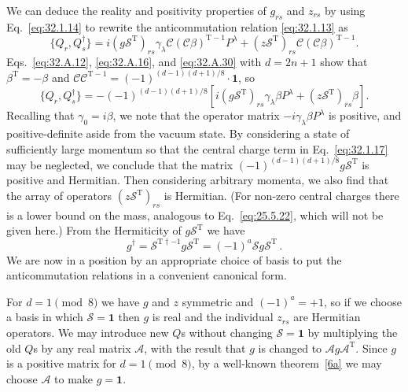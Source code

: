 We can deduce the reality and positivity properties of \(g_{rs}\) and
\(z_{rs}\) by using Eq.~\eqref{eq:32.1.14} to rewrite the anticommutation
relation \eqref{eq:32.1.13} as
\[
  \{Q_r,Q_s^\dagger\}
  =i(g\mathcal S^{\mathrm T})_{rs}
    \gamma_\lambda\mathcal C(\mathcal C\beta)^{\mathrm T-1}P^\lambda
  +(z\mathcal S^{\mathrm T})_{rs}
    \mathcal C(\mathcal C\beta)^{\mathrm T-1}.
\]
Eqs.~\eqref{eq:32.A.12}, \eqref{eq:32.A.16}, and
\eqref{eq:32.A.30} with \(d=2n+1\) show that
\(\beta^{\mathrm T}=-\beta\) and
\(\mathcal C\mathcal C^{\mathrm T-1}
=(-1)^{(d-1)(d+1)/8}\mathbin{\cdot}\mathbf{1}\), so
\begin{equation}
  \{Q_r,Q_s^\dagger\}
  =-(-1)^{(d-1)(d+1)/8}
  \left[
    i(g\mathcal S^{\mathrm T})_{rs}\gamma_\lambda\beta P^\lambda
    +(z\mathcal S^{\mathrm T})_{rs}\beta
  \right].
  \tag{32.1.17}\label{eq:32.1.17}
\end{equation}
Recalling that \(\gamma_0=i\beta\), we note that the operator matrix
\(-i\gamma_\lambda\beta P^\lambda\) is positive, and positive-definite
aside from the vacuum state. By considering a state of sufficiently large
momentum so that the central charge term in Eq.~\eqref{eq:32.1.17} may be
neglected, we conclude that the matrix
\((-1)^{(d-1)(d+1)/8}g\mathcal S^{\mathrm T}\) is positive and Hermitian.
Then considering arbitrary momenta, we also find that the array of operators
\((z\mathcal S^{\mathrm T})_{rs}\) is Hermitian. (For non-zero central
charges there is a lower bound on the mass, analogous to
Eq.~\eqref{eq:25.5.22}, which will not be given here.) From the Hermiticity
of \(g\mathcal S^{\mathrm T}\) we have
\begin{equation}
  g^\dagger
  =\mathcal S^{\mathrm T\dagger-1}g\mathcal S^{\mathrm T}
  =(-1)^a\mathcal Sg\mathcal S^{\mathrm T}\,.
  \tag{32.1.18}\label{eq:32.1.18}
\end{equation}
We are now in a position by an appropriate choice of basis to put the
anticommutation relations in a convenient canonical form.

For \(d=1\pmod 8\) we have \(g\) and \(z\) symmetric and
\((-1)^a=+1\), so if we choose a basis in which
\(\mathcal S=\mathbf{1}\) then \(g\) is real and the individual \(z_{rs}\)
are Hermitian operators. We may introduce new \(Q\)s without changing
\(\mathcal S=\mathbf{1}\) by multiplying the old \(Q\)s by any real matrix
\(\mathcal A\), with the result that \(g\) is changed to
\(\mathcal A g\mathcal A^{\mathrm T}\). Since \(g\) is a positive matrix
for \(d=1\pmod 8\), by a well-known theorem~\hyperref[ch32-ref-6a]{[6a]}
we may choose \(\mathcal A\) to make \(g=\mathbf{1}\).

